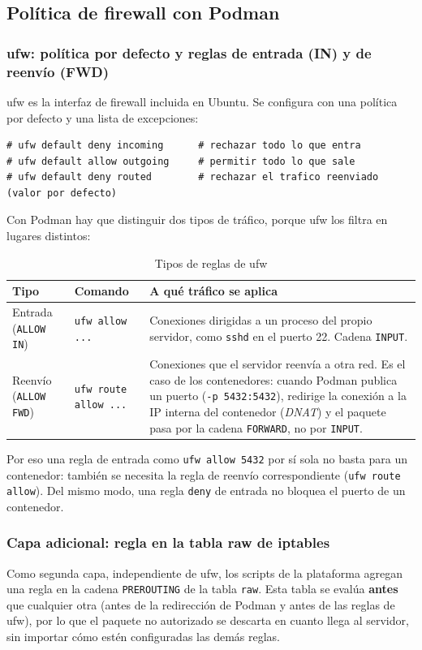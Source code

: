 \subsection{Política de firewall con Podman}\label{sec:3_1_politica_firewall}

\subsubsection{ufw: política por defecto y reglas de entrada (IN) y de reenvío (FWD)}
ufw es la interfaz de firewall incluida en Ubuntu. Se configura con una política por defecto y una lista de excepciones:
\begin{lstlisting}
# ufw default deny incoming      # rechazar todo lo que entra
# ufw default allow outgoing     # permitir todo lo que sale
# ufw default deny routed        # rechazar el trafico reenviado (valor por defecto)
\end{lstlisting}

Con Podman hay que distinguir dos tipos de tráfico, porque ufw los filtra en lugares distintos:
\begin{table}[H]
\centering
\caption{Tipos de reglas de ufw}
\small
\begin{tabular}{p{2.6cm}p{4.2cm}p{7.6cm}}
\toprule
\textbf{Tipo} & \textbf{Comando} & \textbf{A qué tráfico se aplica} \\
\midrule
Entrada (\texttt{ALLOW IN}) & \texttt{ufw allow ...} & Conexiones dirigidas a un proceso del propio servidor, como \texttt{sshd} en el puerto 22. Cadena \texttt{INPUT}. \\
Reenvío (\texttt{ALLOW FWD}) & \texttt{ufw route allow ...} & Conexiones que el servidor reenvía a otra red. Es el caso de los contenedores: cuando Podman publica un puerto (\texttt{-p 5432:5432}), redirige la conexión a la IP interna del contenedor (\emph{DNAT}) y el paquete pasa por la cadena \texttt{FORWARD}, no por \texttt{INPUT}. \\
\bottomrule
\end{tabular}
\end{table}
Por eso una regla de entrada como \texttt{ufw allow 5432} por sí sola no basta para un contenedor: también se necesita la regla de reenvío correspondiente (\texttt{ufw route allow}). Del mismo modo, una regla \texttt{deny} de entrada no bloquea el puerto de un contenedor.

\subsubsection{Capa adicional: regla en la tabla raw de iptables}
Como segunda capa, independiente de ufw, los scripts de la plataforma agregan una regla en la cadena \texttt{PREROUTING} de la tabla \texttt{raw}. Esta tabla se evalúa \textbf{antes} que cualquier otra (antes de la redirección de Podman y antes de las reglas de ufw), por lo que el paquete no autorizado se descarta en cuanto llega al servidor, sin importar cómo estén configuradas las demás reglas.

